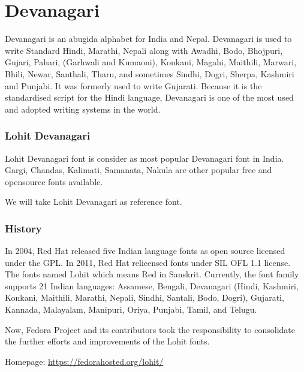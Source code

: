\chapter{Devanagari}

Devanagari is an abugida alphabet for India and Nepal. Devanagari is used to
write Standard Hindi, Marathi, Nepali along with Awadhi, Bodo, Bhojpuri,
Gujari, Pahari, (Garhwali and Kumaoni), Konkani, Magahi, Maithili, Marwari,
Bhili, Newar, Santhali, Tharu, and sometimes Sindhi, Dogri, Sherpa, Kashmiri
and Punjabi. It was formerly used to write Gujarati. Because it is the
standardised script for the Hindi language, Devanagari is one of the most used
and adopted writing systems in the world.


\subsection{Lohit Devanagari}
Lohit Devanagari font is consider as most popular Devanagari font in India.
Gargi, Chandas, Kalimati, Samanata, Nakula are other popular free and
opensource fonts available.

We will take Lohit Devanagari as reference font.

\subsection{History}
In 2004, Red Hat released five Indian language fonts as open source licensed
under the GPL. In 2011, Red Hat relicensed fonts under SIL OFL 1.1 license.
The fonts named Lohit which means Red in Sanskrit. Currently, the font family
supports 21 Indian languages: Assamese, Bengali, Devanagari (Hindi, Kashmiri,
Konkani, Maithili, Marathi, Nepali, Sindhi, Santali, Bodo, Dogri), Gujarati,
Kannada, Malayalam, Manipuri, Oriya, Punjabi, Tamil, and Telugu.

Now, Fedora Project and its contributors took the responsibility to consolidate
the further efforts and improvements of the Lohit fonts.

Homepage: {\url{https://fedorahosted.org/lohit/}}
